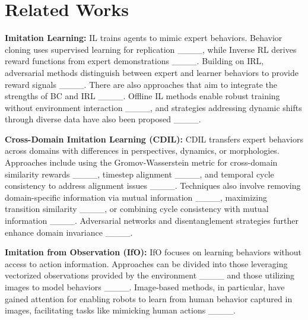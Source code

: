 \section{Related Works}
\label{sec:related}

\vspace{-0.1in}
\textbf{Imitation Learning:} IL trains agents to mimic expert behaviors. Behavior cloning uses supervised learning for replication ____, while Inverse RL derives reward functions from expert demonstrations ____. Building on IRL, adversarial methods distinguish between expert and learner behaviors to provide reward signals ____. There are also approaches that aim to integrate the strengths of BC and IRL ____. Offline IL methods enable robust training without environment interaction ____, and strategies addressing dynamic shifts through diverse data have also been proposed ____.

\textbf{Cross-Domain Imitation Learning (CDIL):} CDIL transfers expert behaviors across domains with differences in perspectives, dynamics, or morphologies. Approaches include using the Gromov-Wasserstein metric for cross-domain similarity rewards ____, timestep alignment ____, and temporal cycle consistency to address alignment issues ____. Techniques also involve removing domain-specific information via mutual information ____, maximizing transition similarity ____, or combining cycle consistency with mutual information ____. Adversarial networks and disentanglement strategies further enhance domain invariance ____.


\textbf{Imitation from Observation (IfO):} IfO focuses on learning behaviors without access to action information. Approaches can be divided into those leveraging vectorized observations provided by the environment ____ and those utilizing images to model behaviors ____. Image-based methods, in particular, have gained attention for enabling robots to learn from human behavior captured in images, facilitating tasks like mimicking human actions ____.

